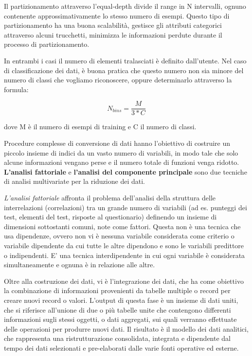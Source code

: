 \documentclass[a4paper]{extarticle}
\begin{document}
Il partizionamento attraverso l'equal-depth divide il range in N intervalli, ognuno contenente approssimativamente lo stesso numero di esempi. Questo tipo di partizionamento ha una buona scalabilità, gestisce gli attributi categorici attraverso alcuni trucchetti, minimizza le informazioni perdute durante il processo di partizionamento.

In entrambi i casi il numero di elementi tralasciati è definito dall'utente. Nel caso di classificazione dei dati, è buona pratica che questo numero non sia minore del numero di classi che vogliamo riconoscere, oppure determinarlo attraverso la formula:

\begin{equation}
N_{bins} = \frac{M}{3*C}
\end{equation}

dove M è il numero di esempi di training e C il numero di classi.

Procedure complesse di conversione di dati hanno l'obiettivo di costruire un piccolo insieme di indici da un vasto numero di variabili, in modo tale che solo alcune informazioni vengano perse e il numero totale di funzioni venga ridotto. \textbf{L'analisi fattoriale} e \textbf{l'analisi del componente principale} sono due tecniche di analisi multivariate per la riduzione dei dati. 

\textit{L'analisi fattoriale} affronta il problema dell'analisi della struttura delle interrelazioni (correlazioni) tra un grande numero di variabili (ad es. punteggi dei test, elementi del test, risposte al questionario) definendo un insieme di dimensioni sottostanti comuni, note come fattori. Questa non è una tecnica che usa dipendenze, ovvero non vi è nessuna variabile considerata come criterio o variabile dipendente da cui tutte le altre dipendono e sono le variabili predittore o indipendenti. E' una tecnica interdipendente in cui ogni variabile è considerata simultaneamente e ognuna è in relazione alle altre.

Oltre alla costruzione dei dati, vi è l'integrazione dei dati, che ha come obiettivo la combinazione di informazioni provenienti da tabelle multiple o record per creare nuovi record o valori. L'output di questa fase è un insieme di dati uniti, che si riferisce all'unione di due o più tabelle unite che contengono differenti informazioni sugli stessi oggetti, o dati aggregati, sui quali verranno effettuate delle operazioni per produrre nuovi dati. Il risultato è il modello dei dati analitici, che rappresenta una ristrutturazione consolidata, integrata e dipendente dal tempo dei dati selezionati e pre-elaborati dalle varie fonti operative ed esterne. 
\end{document}
